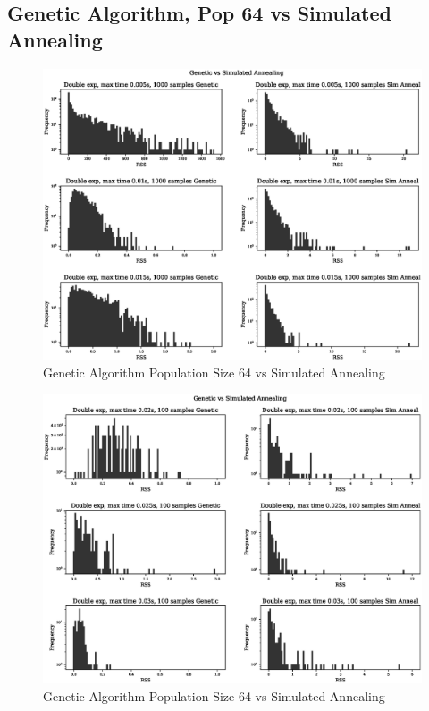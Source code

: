 \FloatBarrier
\subsection{Genetic Algorithm, Pop 64 vs Simulated Annealing}

\begin{figure}[h]
  \begin{center}
    \includegraphics[width=15.0cm]{appendix/sim_anneal_genetic/pop_64/plot_name_9.eps}
    \caption{Genetic Algorithm Population Size 64 vs Simulated Annealing}
    \label{fig:ga_vs_sim_64_1}
  \end{center}
\end{figure}

\begin{figure}[h]
  \begin{center}
    \includegraphics[width=15.0cm]{appendix/sim_anneal_genetic/pop_64/plot_name_10.eps}
    \caption{Genetic Algorithm Population Size 64 vs Simulated Annealing}
    \label{fig:ga_vs_sim_64_2}
  \end{center}
\end{figure}

